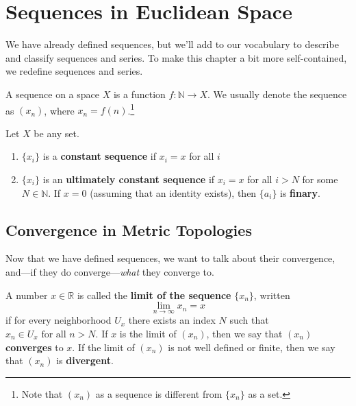 \section{Sequences in Euclidean Space} 

  We have already defined sequences, but we'll add to our vocabulary to describe and classify sequences and series. To make this chapter a bit more self-contained, we redefine sequences and series. 

  \begin{definition}[Sequence]
    \label{def:sequence}
    A sequence on a space $X$ is a function $f: \mathbb{N} \rightarrow X$. We usually denote the sequence as $(x_n)$, where $x_n = f(n)$.\footnote{Note that $(x_n)$ as a sequence is different from $\{x_n\}$ as a set.} 
  \end{definition}

  \begin{definition}
    Let $X$ be any set. 
    \begin{enumerate}
      \item $\{x_i\}$ is a \textbf{constant sequence} if $x_i = x$ for all $i$
      \item $\{x_i\}$ is an \textbf{ultimately constant sequence} if $x_i = x$ for all $i > N$ for some $N \in \mathbb{N}$. If $x = 0$ (assuming that an identity exists), then $\{a_i\}$ is \textbf{finary}.
    \end{enumerate}
  \end{definition}

\subsection{Convergence in Metric Topologies}

  Now that we have defined sequences, we want to talk about their convergence, and---if they do converge---\textit{what} they converge to. 

  \begin{definition}
    A number $x \in \mathbb{R}$ is called the \textbf{limit of the sequence} $\{x_n\}$, written 
    \begin{equation}
      \lim_{n \rightarrow \infty} x_n = x
    \end{equation}
    if for every neighborhood $U_x$ there exists an index $N$ such that $x_n \in U_x \text{ for all } n > N$. If $x$ is the limit of $(x_n)$, then we say that $(x_n)$ \textbf{converges} to $x$. If the limit of $(x_n)$ is not well defined or finite, then we say that $(x_n)$ is \textbf{divergent}. 
  \end{definition}

